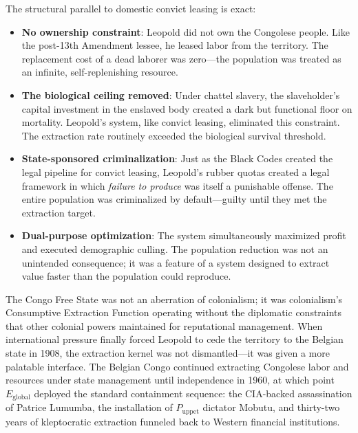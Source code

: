 \documentclass[12pt,openany]{book}
\begin{document}
The structural parallel to domestic convict leasing is exact:

\begin{itemize}
    \item \textbf{No ownership constraint}: Leopold did not own the Congolese people. Like the post-13th Amendment lessee, he leased labor from the territory. The replacement cost of a dead laborer was zero---the population was treated as an infinite, self-replenishing resource.

    \item \textbf{The biological ceiling removed}: Under chattel slavery, the slaveholder's capital investment in the enslaved body created a dark but functional floor on mortality. Leopold's system, like convict leasing, eliminated this constraint. The extraction rate routinely exceeded the biological survival threshold.

    \item \textbf{State-sponsored criminalization}: Just as the Black Codes created the legal pipeline for convict leasing, Leopold's rubber quotas created a legal framework in which \textit{failure to produce} was itself a punishable offense. The entire population was criminalized by default---guilty until they met the extraction target.

    \item \textbf{Dual-purpose optimization}: The system simultaneously maximized profit and executed demographic culling. The population reduction was not an unintended consequence; it was a feature of a system designed to extract value faster than the population could reproduce.
\end{itemize}

The Congo Free State was not an aberration of colonialism; it was colonialism's Consumptive Extraction Function operating without the diplomatic constraints that other colonial powers maintained for reputational management. When international pressure finally forced Leopold to cede the territory to the Belgian state in 1908, the extraction kernel was not dismantled---it was given a more palatable interface. The Belgian Congo continued extracting Congolese labor and resources under state management until independence in 1960, at which point $E_{\text{global}}$ deployed the standard containment sequence: the CIA-backed assassination of Patrice Lumumba, the installation of $P_{\text{uppet}}$ dictator Mobutu, and thirty-two years of kleptocratic extraction funneled back to Western financial institutions.
\end{document}
